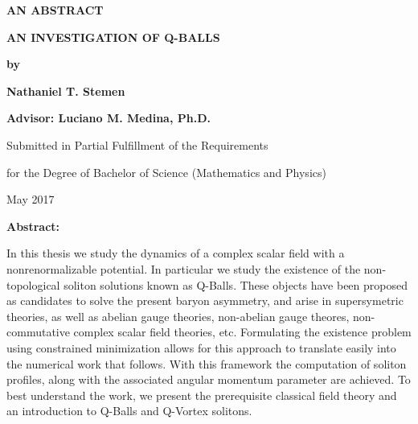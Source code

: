 \documentclass[12pt]{report}
\theoremstyle{definition}
\begin{document}
\begin{center}
\begin{minipage}{\linewidth}
    \centering

    \textbf{AN ABSTRACT} \\ \vspace{1.cm}

    \textbf{AN INVESTIGATION OF Q-BALLS} \\ \vspace{0.5cm}

    \textbf{by} \\ \vspace{0.75cm}

    \textbf{Nathaniel T. Stemen} \\ \vspace{0.75cm}

    \textbf{Advisor: Luciano M. Medina, Ph.D.} \\ \vspace{1.cm}

    {Submitted in Partial Fulfillment of the Requirements} \\ \vspace{0.5cm}

    {for the Degree of Bachelor of Science (Mathematics and Physics)} \\ \vspace{1.cm}

    {May 2017} \\ \vspace{0.5cm}

    {\textbf{Abstract:}}

    {In this thesis we study the dynamics of a complex scalar field with a
    nonrenormalizable potential. In particular we study the existence of the
    non-topological soliton solutions known as Q-Balls. These objects have been
    proposed as candidates to solve the present baryon asymmetry, and arise in
    supersymetric theories, as well as abelian gauge theories, non-abelian gauge
    theores, non-commutative complex scalar field theories, etc. Formulating the
    existence problem using constrained minimization allows for this approach to
    translate easily into the numerical work that follows. With this framework
    the computation of soliton profiles, along with the associated angular
    momentum parameter are achieved. To best understand the work, we present the
    prerequisite classical field theory and an introduction to Q-Balls and
    Q-Vortex solitons.}
\end{minipage}
\end{center}
\clearpage
\end{document}
